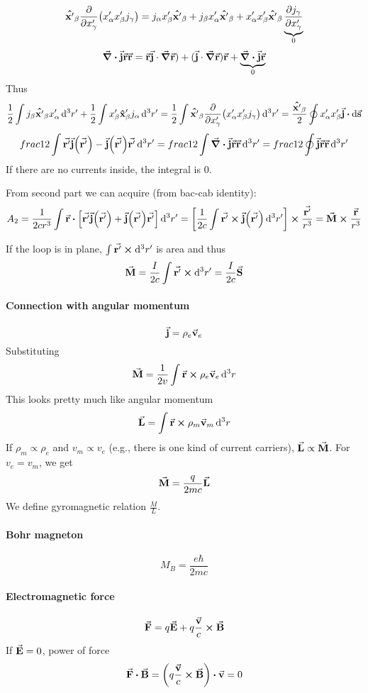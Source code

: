 $$\vu{x'}_\beta \pdv{x'_\gamma} \qty(x'_\alpha x'_\beta j_\gamma ) = j_\alpha x'_\beta \vu{x'}_\beta + j_\beta x'_\alpha \vu{x'}_\beta + x'_\alpha x'_\beta \vu{x'}_\beta \underbrace{\pdv{j_\gamma}{x'_\gamma}}_{0} $$
$$\div{\va{j}\va{r}\va{r}} = \va{r}\va{j}\cdot \grad{\va{r}}) + (\va{j}\cdot \grad{\va{r}})\va{r} + \underbrace{\div{\va{j}}\va{r}}_{0}$$
Thus
$$ \frac{1}{2} \int j_\beta \vu{x'}_\beta  x'_\alpha \dd[3]{r'} + \frac{1}{2} \int x'_\beta \vu{x}'_\beta j_\alpha \dd[3]{r'} =\frac{1}{2} \int \vu{x'}_\beta \pdv{x'_\gamma} \qty(x'_\alpha x'_\beta j_\gamma )  \dd[3]{r'} =  \frac{\vu{x'}_\beta}{2} \oint  x'_\alpha x'_\beta \va{j} \vdot \dd{\va{s}}$$
$$ frac{1}{2}\int \va{r'} \va{j}\qty(\va{r'}) -\va{j}\qty(\va{r'})\va{r'}  \dd[3]{r'} = frac{1}{2}\int \div{\va{j}\va{r}\va{r}} \dd[3]{r'} = frac{1}{2} \oint \va{j}\va{r}\va{r} \dd[3]{r'}$$
If there are no currents inside, the integral is 0.

From second part we can acquire (from bac-cab identity):
$$A_2  = \frac{1}{2cr^3} \int \va{r} \vdot \qty[\va{r'} \va{j}\qty(\va{r'}) +\va{j}\qty(\va{r'})\va{r'}  ]\dd[3]{r'} = \qty[\frac{1}{2c} \int \va{r'} \cross \va{j}\qty(\va{r'}) \dd[3]{r'} ] \cross \frac{\va{r'}}{r^3} = \va{M} \cross \frac{\va{r}}{r^3}$$ 

If the loop is in plane,  $\int \va{r'} \cross \dd[3]{r'}$ is area and thus
$$\va{M} = \frac{I}{2c} \int \va{r'} \cross \dd[3]{r'} = \frac{I}{2c} \va{S}$$

\paragraph{Connection with angular momentum}
$$\va{j} = \rho_e \va{v}_e$$
Substituting
$$\va{M} = \frac{1}{2v} \int \va{r} \cross \rho_e \va{v}_e \dd[3]{r}$$
This looks pretty much like angular momentum
$$\va{L} =  \int \va{r} \cross \rho_m \va{v}_m \dd[3]{r}$$
If $\rho_m \propto \rho_e$ and $v_m \propto v_e$ (e.g., there is one kind of current carriers), $\va{L}\propto \va{M}$. For $v_e=v_m$, we get
$$\va{M} = \frac{q}{2mc} \va{L}$$
We define gyromagnetic relation $\frac{M}{L}$.
\paragraph{Bohr magneton} $$M_B = \frac{e\hbar}{2mc}$$
\paragraph{Electromagnetic force}
$$\va{F} = q\va{E}  + q\frac{\va{v}}{c}\cross \va{B}$$
If $\va{E} = 0$, power of force
$$\va{F} \vdot \va{B} = \qty(q\frac{\va{v}}{c}\cross \va{B}) \vdot \va{v}= 0$$

